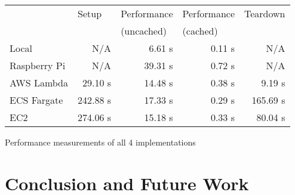 \begin{fig}[H]
\begin{center}
\begin{tabular}{|l|r|r|r|r|}
\hline
\rowcolor{lightpink}
& \multicolumn{1}{l|}{Setup} & \multicolumn{1}{l|}{Performance} & \multicolumn{1}{l|}{Performance} & \multicolumn{1}{l|}{Teardown} \\
\rowcolor{lightpink}
& & \multicolumn{1}{l|}{(uncached)} & \multicolumn{1}{l|}{(cached)} & \\ \hline
Local & N/A & 6.61 s & 0.11 s & N/A \\ \hline
Raspberry Pi & N/A & 39.31 s & 0.72 s & N/A \\ \hline
AWS Lambda & 29.10 s & 14.48 s & 0.38 s & 9.19 s \\ \hline
ECS Fargate & 242.88 s & 17.33 s & 0.29 s & 165.69 s \\ \hline
EC2 & 274.06 s & 15.18 s & 0.33 s & 80.04 s \\ \hline
\end{tabular}
\caption{Performance measurements of all 4 implementations}
\end{center}
\end{fig}

\chapter{Conclusion and Future Work}
